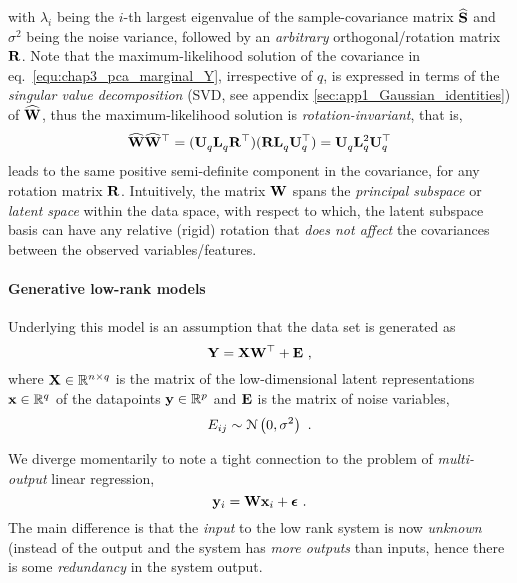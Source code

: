       with $\lambda_i$ being the $i$-th largest eigenvalue of the sample-covariance matrix $\widehat{\mathbf{S}}$ and $\sigma^2$ being the noise variance, followed by an \emph{arbitrary} orthogonal/rotation matrix $\mathbf{R}$. Note that the maximum-likelihood solution of the covariance in eq.~\eqref{equ:chap3_pca_marginal_Y}, irrespective of $q$, is expressed in terms of the \emph{singular value decomposition} (SVD, see appendix \ref{sec:app1_Gaussian_identities}) of $\widehat{\mathbf{W}}$, thus the maximum-likelihood solution  is \emph{rotation-invariant}, that is,
      \[
	\widehat{\mathbf{W}} \widehat{\mathbf{W}}^\top = (\mathbf{U}^{~}_q \mathbf{L}^{~}_q \mathbf{R}^\top)(\mathbf{R} \mathbf{L}^{~}_q  \mathbf{U}_q^\top)
	  = \mathbf{U}^{~}_q \mathbf{L}^2_q \mathbf{U}_q^\top
      \]
      leads to the same positive semi-definite component in the covariance, for any rotation matrix $\mathbf{R}$. Intuitively, the matrix $\mathbf{W}$ spans the \emph{principal subspace} or \emph{latent space} within the data space, with respect to which, the latent subspace basis can have any relative (rigid) rotation that \emph{does not affect} the covariances between the observed variables/features.

      \paragraph{Generative low-rank models} Underlying this model is an assumption that the data set is generated as
      \[
	\mathbf{Y} = \mathbf{X}\mathbf{W}^\top + \mathbf{E} ~,
      \]
      where $\mathbf{X} \in \mathbb{R}^{n\times q}$ is the matrix of the low-dimensional latent representations $\mathbf{x} \in \mathbb{R}^q$ of the datapoints $\mathbf{y} \in \mathbb{R}^p$ and $\mathbf{E}$ is the matrix of noise variables,
      \[
	E_{ij} \sim \mathcal{N} \left( 0, \sigma^2 \right) ~.
      \]
      
      We diverge momentarily to note a tight connection to the problem of \emph{multi-output} linear regression,
      \begin{equation} \label{equ:chap3_multi_output}
	\mathbf{y}_i = \mathbf{W} \mathbf{x}_i + \boldsymbol{\epsilon} ~.
      \end{equation}
      The main difference is that the \emph{input} to the low rank system is now \emph{unknown} (instead of the output and the system has \emph{more outputs} than inputs, hence there is some \emph{redundancy} in the system output.
      
